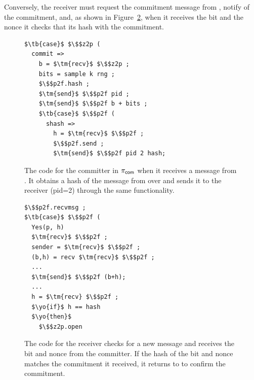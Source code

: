 Conversely, the receiver must request the commitment  message from \Fropp, notify \Z of the commitment, and, as shown in Figure~\ref{lst:receiver}, when it receives the bit and the nonce it checks that its hash with the commitment.
\begin{figure}
\begin{lstlisting}[basicstyle=\small\BeraMonottFamily, frame=single, mathescape]
$\tb{case}$ $\$$z2p (
  commit => 
    b = $\tm{recv}$ $\$$z2p ;
    bits = sample k rng ;
    $\$$p2f.hash ;
    $\tm{send}$ $\$$p2f pid ;
    $\tm{send}$ $\$$p2f b + bits ;
    $\tb{case}$ $\$$p2f (
      shash => 
        h = $\tm{recv}$ $\$$p2f ;
        $\$$p2f.send ;
        $\tm{send}$ $\$$p2f pid 2 hash;
\end{lstlisting}
\caption{The code for the committer in $\pi_{{\mathsf {com}}}$ when it receives a  message from \Z. It obtains a hash of the message from \Fropp over  and sends it to the receiver (pid=2) through the same functionality.}
\label{lst:committer}
\end{figure}
\begin{figure}
\begin{lstlisting}[basicstyle=\small\BeraMonottFamily, frame=single, mathescape]
$\$$p2f.recvmsg ;
$\tb{case}$ $\$$p2f (
  Yes(p, h)
  $\tm{recv}$ $\$$p2f ;
  sender = $\tm{recv}$ $\$$p2f ;
  (b,h) = recv $\tm{recv}$ $\$$p2f ;
  ...
  $\tm{send}$ $\$$p2f (b+h);
  ...
  h = $\tm{recv} $\$$p2f ;
  $\yo{if}$ h == hash
  $\yo{then}$
    $\$$z2p.open
\end{lstlisting}
\caption{The code for the receiver checks for a new message and receives the bit and nonce from the committer. If the hash of the bit and nonce matches the commitment it received, it returns  to \Z to confirm the commitment.}
\label{lst:receiver}
\end{figure}


